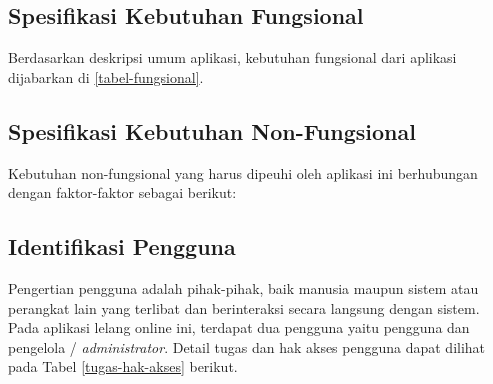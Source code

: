   \subsection{Spesifikasi Kebutuhan Fungsional}
  \vspace{-5mm}
  Berdasarkan deskripsi umum aplikasi, kebutuhan fungsional dari aplikasi dijabarkan di \ref{tabel-fungsional}.

  
  \subsection{Spesifikasi Kebutuhan Non-Fungsional}
  
  Kebutuhan non-fungsional yang harus dipeuhi oleh aplikasi ini berhubungan dengan faktor-faktor sebagai berikut:

  
  \newpage
  
  \subsection{Identifikasi Pengguna}
  Pengertian pengguna adalah pihak-pihak, baik manusia maupun sistem atau perangkat lain yang terlibat dan berinteraksi secara langsung dengan sistem. Pada aplikasi lelang online ini, terdapat dua pengguna yaitu pengguna dan pengelola / \textit{administrator}. Detail tugas dan hak akses pengguna dapat dilihat pada Tabel \ref{tugas-hak-akses} berikut.
  
\begin{table}[H]
\centering
{}
\caption{Detail Tugas dan Hak Akses Pengguna}
\label{tugas-hak-akses}
\end{table}
  
  
